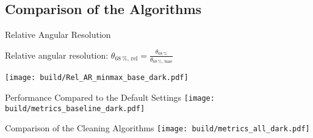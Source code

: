 \subsection{Comparison of the Algorithms}%
\label{sub:Comparison}

\begin{frame}[label=rel_AR]{Relative Angular Resolution}
    \begin{flushleft}
        Relative angular resolution: \hspace{2cm} \(\displaystyle \theta_{\SI{68}{\percent},\,\text{rel}} = \frac{\theta_{\SI{68}{\percent}}}{\theta_{\SI{68}{\percent},\,\text{base}}}\)
    \end{flushleft}

    \vspace{0.75cm}
    \centering
    \texttt{[image: build/Rel\_AR\_minmax\_base\_dark.pdf]}
\end{frame}

\begin{frame}[label=metrics_baseline]{Performance Compared to the Default Settings}
    \centering
    \texttt{[image: build/metrics\_baseline\_dark.pdf]}
\end{frame}

\begin{frame}{Comparison of the Cleaning Algorithms}
    \centering
    \texttt{[image: build/metrics\_all\_dark.pdf]}
\end{frame}

